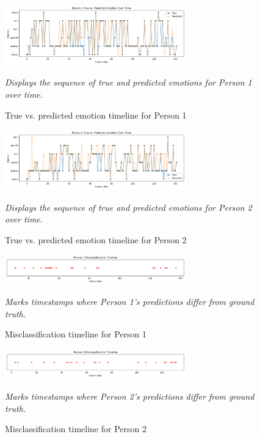 \documentclass[12pt]{article}
\begin{document}
\begin{figure}[h!]
    \centering
    \includegraphics[width=0.7\textwidth]{model_analysis/Person 1_emotion_timeline.png}
    \caption{True vs. predicted emotion timeline for Person 1}
    \textit{Displays the sequence of true and predicted emotions for Person 1 over time.}
\end{figure}
\begin{figure}[h!]
    \centering
    \includegraphics[width=0.7\textwidth]{model_analysis/Person 2_emotion_timeline.png}
    \caption{True vs. predicted emotion timeline for Person 2}
    \textit{Displays the sequence of true and predicted emotions for Person 2 over time.}
\end{figure}

\begin{figure}[h!]
    \centering
    \includegraphics[width=0.7\textwidth]{model_analysis/Person 1_misclassification_timeline.png}
    \caption{Misclassification timeline for Person 1}
    \textit{Marks timestamps where Person 1's predictions differ from ground truth.}
\end{figure}
\begin{figure}[h!]
    \centering
    \includegraphics[width=0.7\textwidth]{model_analysis/Person 2_misclassification_timeline.png}
    \caption{Misclassification timeline for Person 2}
    \textit{Marks timestamps where Person 2's predictions differ from ground truth.}
\end{figure}
\end{document}
